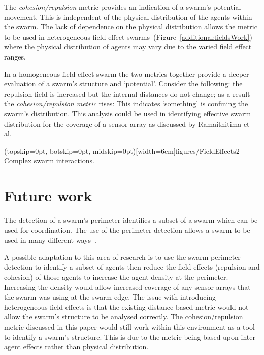 \documentclass{ieeeaccess}
\begin{document}
The \emph{cohesion/repulsion} metric provides an indication of a swarm's potential movement. This is independent of the physical distribution of the agents within the swarm. The lack of dependence on the physical distribution allows the metric to be used in heterogeneous field effect swarms~(Figure~\ref{additional:fieldsWork}) where the physical distribution of agents may vary due to the varied field effect ranges. 

In a homogeneous field effect swarm the two metrics together provide a deeper evaluation of a swarm's structure and `potential'. Consider the following: the repulsion field is increased but the internal distances do not change; as a result the \emph{cohesion/repulsion metric} rises: This indicates `something' is confining the swarm's distribution. This analysis could be used in identifying effective swarm distribution for the coverage of a sensor array as discussed by Ramaithitima et al.~\cite{RWBK:15}

\Figure[t!](topskip=0pt, botskip=0pt, midskip=0pt)[width=6cm]{figures/FieldEffects2}
{Complex swarm interactions.\label{additional:fieldsWork}}


\section{Future work\label{metric:Future}}
The detection of a swarm's perimeter \cite{MD:09, MJ:08, ZAPS:07, JG:13} identifies a subset of a swarm which can be used for coordination. The use of the perimeter detection allows a swarm to be used in many different ways~\cite{ZFG:13, AKK:08, APZDAMC:09, AZDPS:11}. 

A possible adaptation to this area of research is to use the swarm perimeter detection to identify a subset of agents then reduce the field effects (repulsion and cohesion) of those agents to increase the agent density at the perimeter. Increasing the density would allow increased coverage of any sensor arrays that the swarm was using at the swarm edge. The issue with introducing heterogeneous field effects is that the existing distance-based metric would not allow the swarm's structure to be analysed correctly. The cohesion/repulsion metric discussed in this paper would still work within this environment as a tool to identify a swarm's structure. This is due to the metric being based upon inter-agent effects rather than physical distribution. 
\end{document}
